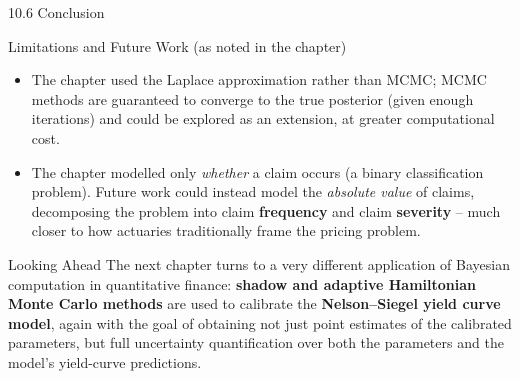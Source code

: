 \documentclass[aspectratio=169,10pt]{beamer}
\begin{document}
\begin{frame}[allowframebreaks]{10.6 Conclusion}
  \begin{block}{Limitations and Future Work (as noted in the chapter)}
    \begin{itemize}
      \item The chapter used the Laplace approximation rather than MCMC;
        MCMC methods are guaranteed to converge to the true posterior (given
        enough iterations) and could be explored as an extension, at greater
        computational cost.
      \item The chapter modelled only \emph{whether} a claim occurs (a
        binary classification problem). Future work could instead model the
        \emph{absolute value} of claims, decomposing the problem into claim
        \textbf{frequency} and claim \textbf{severity} -- much closer to how
        actuaries traditionally frame the pricing problem.
    \end{itemize}
  \end{block}

  \begin{alertblock}{Looking Ahead}
    The next chapter turns to a very different application of Bayesian
    computation in quantitative finance: \textbf{shadow and adaptive
    Hamiltonian Monte Carlo methods} are used to calibrate the
    \textbf{Nelson--Siegel yield curve model}, again with the goal of
    obtaining not just point estimates of the calibrated parameters, but full
    uncertainty quantification over both the parameters and the model's
    yield-curve predictions.
  \end{alertblock}

\end{frame}
\end{document}
